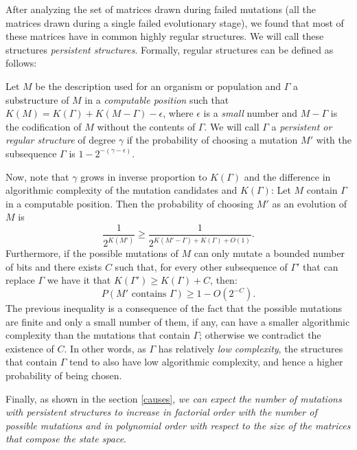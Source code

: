 \documentclass[10pt]{article}
\begin{document}
After analyzing the set of matrices drawn during failed mutations (all the matrices drawn during a single failed evolutionary stage), we found that most of these matrices have in common highly regular structures. We will call these structures \textit{persistent structures}. Formally, regular structures can be defined as follows:

\begin{defn}\label{persistent}
Let \(M\) be the description used for an organism or population and \(\Gamma\) a
substructure of \(M\) in a \emph{computable position} such that
\(K(M) = K(\Gamma) + K(M-\Gamma)-\epsilon\), where \(\epsilon\) is a \emph{small} number and $M-\Gamma$ is the codification of $M$ without the contents of $\Gamma$. We will call \(\Gamma\) a \emph{persistent or regular structure} of degree \(\gamma\) if the probability of choosing a mutation \(M'\) with the subsequence \(\Gamma\) is \(1-2^{-(\gamma-\epsilon)}\).
\end{defn}

Now, note that \(\gamma\) grows in inverse proportion to \(K(\Gamma)\) and the difference in algorithmic complexity of the mutation candidates and \(K(\Gamma)\): Let \(M\) contain \(\Gamma\) in a
computable position. Then the probability of choosing \(M'\) as an evolution of \(M\) is
\[\frac{1}{2^{K(M')}} \geq \frac{1}{2^{K(M'-\Gamma)+K(\Gamma)+O(1)}}.\]
Furthermore, if the possible mutations of \(M\) can only mutate a
bounded number of bits and there exists \(C\) such that, for every other
subsequence of \(\Gamma'\) that can replace \(\Gamma\) we have it
that
\(K(\Gamma') \geq K(\Gamma) + C\), then:
\[P(M'\text{ contains }\Gamma) \geq 1 - O({2^{-C}}).\] The previous
inequality is a consequence of the fact that the possible mutations are finite and
only a small number of them, if any, can have a smaller algorithmic
complexity than the mutations that contain \(\Gamma\); otherwise we
contradict the existence of \(C\). In other words, as \(\Gamma\)  has relatively \emph{low complexity}, the structures that contain \(\Gamma\)
tend to also have low algorithmic complexity, and hence a higher
probability of being chosen.

Finally, as shown in the section \ref{causes}, \emph{we can expect the
    number of mutations with persistent structures to increase in 
    factorial order with the number of possible mutations and in polynomial
    order with respect to the size of the matrices that compose the state
    space}.
\end{document}
